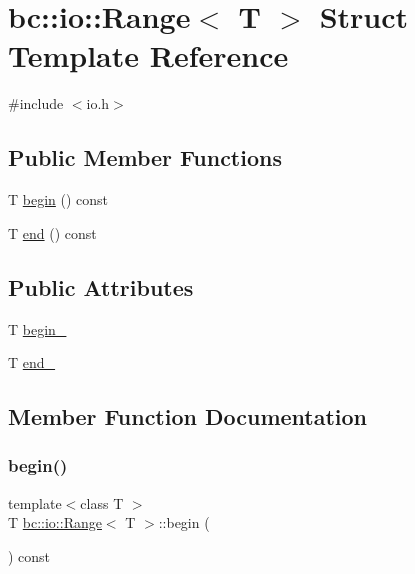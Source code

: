\hypertarget{structbc_1_1io_1_1Range}{}\section{bc\+:\+:io\+:\+:Range$<$ T $>$ Struct Template Reference}
\label{structbc_1_1io_1_1Range}


{\ttfamily \#include $<$io.\+h$>$}

\subsection*{Public Member Functions}
\begin{DoxyCompactItemize}
\item 
T \hyperlink{structbc_1_1io_1_1Range_a85bcc088b706f383bc0bf9b3217a04ff}{begin} () const
\item 
T \hyperlink{structbc_1_1io_1_1Range_a05327555759f7e2adcb5c7878a0733e1}{end} () const
\end{DoxyCompactItemize}
\subsection*{Public Attributes}
\begin{DoxyCompactItemize}
\item 
T \hyperlink{structbc_1_1io_1_1Range_aec9c4435bef83dc46adb59289ffafc0b}{begin\+\_\+}
\item 
T \hyperlink{structbc_1_1io_1_1Range_abe3c74187db600a531a5bbb3e213625d}{end\+\_\+}
\end{DoxyCompactItemize}


\subsection{Member Function Documentation}
\mbox{\label{structbc_1_1io_1_1Range_a85bcc088b706f383bc0bf9b3217a04ff}} 
\subsubsection{\texorpdfstring{begin()}{begin()}}
{\footnotesize\ttfamily template$<$class T $>$ \\
T \hyperlink{structbc_1_1io_1_1Range}{bc\+::io\+::\+Range}$<$ T $>$\+::begin (\begin{DoxyParamCaption}{ }\end{DoxyParamCaption}) const\hspace{0.3cm}{\ttfamily [inline]}}

